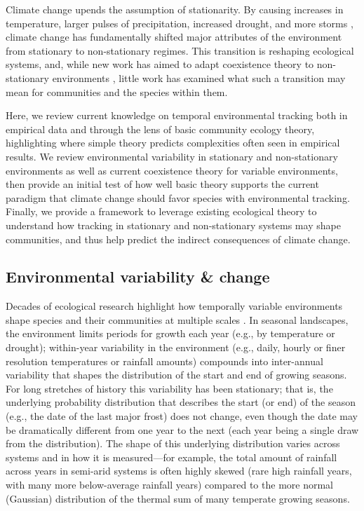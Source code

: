 \documentclass[11pt,letterpaper]{article}
\begin{document}
Climate change upends the assumption of stationarity. By causing increases in temperature, larger pulses of precipitation, increased drought, and more storms \citep{ipcc2013}, climate change has fundamentally shifted major attributes of the environment from stationary to non-stationary regimes. This transition is reshaping ecological systems, and, while new work has aimed to adapt coexistence theory to non-stationary environments \citep{chessonnonstat}, little work has examined what such a transition may mean for communities and the species within them.  %

Here, we review current knowledge on temporal environmental tracking both in empirical data and through the lens of basic community ecology theory, highlighting where simple theory predicts complexities often seen in empirical results. We review environmental variability in stationary and non-stationary environments as well as current coexistence theory for variable environments, then provide an initial test of how well basic theory supports the current paradigm that climate change should favor species with environmental tracking. Finally, we provide a framework to leverage existing ecological theory to understand how tracking in stationary and non-stationary systems may shape communities, and thus help predict the indirect consequences of climate change. 

\subsection{Environmental variability \& change}

Decades of ecological research highlight how temporally variable environments shape species and their communities at multiple scales \citep{Sale:1977oq,Chesson:1997dz}.  In seasonal landscapes, the environment limits periods for growth each year (e.g., by temperature or drought); within-year variability in the environment (e.g., daily, hourly or finer resolution temperatures or rainfall amounts) compounds into inter-annual variability that shapes the distribution of the start and end of growing seasons. For long stretches of history this variability has been stationary; that is, the underlying probability distribution that describes the start (or end) of the season (e.g., the date of the last major frost) does not change, even though the date may be dramatically different from one year to the  next (each year being a single draw from the distribution). The shape of this underlying distribution varies across systems and in how it is measured---for example, the total amount of rainfall across years in semi-arid systems is often highly skewed (rare high rainfall years, with many more below-average rainfall years) compared to the more normal (Gaussian) distribution of the thermal sum of many temperate growing seasons. 
\end{document}
